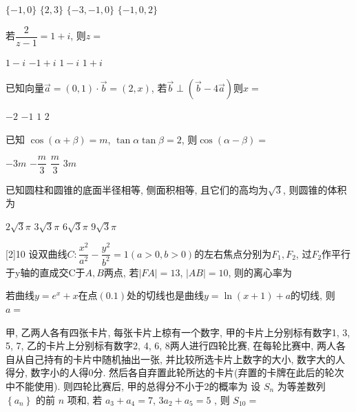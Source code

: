 \documentclass[addtable,twoside,12pt]{hynuexam2024}
\begin{document}
\begin{questions}
		\begin{oneparchoices}
			\choice $\{-1,0\}$
			\choice $\{2,3\}$
			\choice $\{-3,-1,0\}$
			\choice $ \{-1,0,2\}  $
		\end{oneparchoices}

		\question  若$\dfrac{2}{z-1}=1+i$, 则$z=$\chABCD[]

		\begin{oneparchoices}
			\choice $1-i$
			\choice $-1+i$
			\choice $1-i$
			\choice $1+i $
		\end{oneparchoices}

		\question  已知向量$\vec{a}=(0,1) \cdot \vec{b}=(2,x)$, 若$\vec{b} \perp(\vec{b}-4\vec{a})$则$x=$\chABCD[]

		\begin{oneparchoices}
			\choice $-2$
			\choice  $-1$
			\choice  $1$
			\choice $2$
		\end{oneparchoices}

		\question  已知  $\cos (\alpha +\beta)=m$, $\tan \alpha  \tan \beta=2$, 则$\cos (\alpha -\beta)=$\chABCD[]

		\begin{oneparchoices}
			\choice $-3m$
			\choice $-\dfrac{m}{3}$
			\choice $\dfrac{m}{3}$
			\CorrectChoice  $3m$
		\end{oneparchoices}

		\question  已知圆柱和圆锥的底面半径相等, 侧面积相等, 且它们的高均为$\sqrt{3}$, 则圆锥的体积为\chABCD[]

		\begin{oneparchoices}
			\choice$2 \sqrt{3} \pi$
			\choice$3 \sqrt{3} \pi$
			\choice  $6 \sqrt{3} \pi$
			\CorrectChoice $9 \sqrt{3} \pi$
		\end{oneparchoices}

		[2]{10}\setlength\fillinlinelength{1in}%
		\question 设双曲线$C: \dfrac{x^{2}}{a^{2}}-\dfrac{y^{2}}{b^{2}}=1(a>0, b>0)$的左右焦点分别为$F_{1}, F_{2}$, 过$ F_{2}$作平行于y轴的直成交C于$A, B$两点, 若$|FA|=13$, $|A B|=10$, 则的离心率为\fillanswer

		\question 若曲线$y=e^{x}+x$在点$(0.1)$处的切线也是曲线$ y=\ln (x+1)+a $的切线, 则$a=$\fillin

		\question 甲, 乙两人各有四张卡片, 每张卡片上椋有一个数字, 甲的卡片上分别标有数字1, 3, 5, 7, 乙的卡片上分别标有数字2, 4, 6, 8两人进行四轮比赛, 在每轮比赛中, 两人各自从自己持有的卡片中随机抽出一张, 并比较所选卡片上数字的大小, 数字大的人得分, 数字小的人得0分. 然后各自弃置此轮所达的卡片(弃置的卡牌在此后的轮次中不能使用). 则四轮比赛后, 甲的总得分不小于2的概率为\fillin[][2in]
		\question 设 $S_n$ 为等差数列 $\left\{a_n\right\}$ 的前 $n$ 项和,  若 $a_3+a_4=7 $,    $3 a_2+a_5=5$ ,  则 $S_{10}=$ \fillin


\end{questions}
\end{document}
